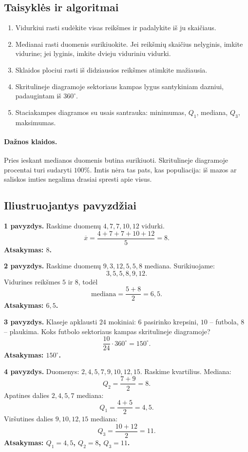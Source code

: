 \subsection{Taisyklės ir algoritmai}
\begin{enumerate}[label=\arabic*.]
\item Vidurkiui rasti sudėkite visas reikšmes ir padalykite iš ju skaičiaus.
\item Medianai rasti duomenis surikiuokite. Jei reikšmių skaičius nelyginis, imkite vidurine; jei lyginis, imkite dvieju viduriniu vidurki.
\item Sklaidos plociui rasti iš didziausios reikšmes atimkite mažiausia.
\item Skritulineje diagramoje sektoriaus kampas lygus santykiniam dazniui, padaugintam iš $360^\circ$.
\item Staciakampes diagramos su usais santrauka: minimumas, $Q_1$, mediana, $Q_3$, maksimumas.
\end{enumerate}
\paragraph{Dažnos klaidos.}
Pries ieskant medianos duomenis butina surikiuoti. Skritulineje diagramoje procentai turi sudaryti $100\%$. Imtis nėra tas pats, kas populiacija: iš mazos ar saliskos imties negalima drasiai spresti apie visus.

\subsection{Iliustruojantys pavyzdžiai}
\textbf{1 pavyzdys.} Raskime duomenų $4,7,7,10,12$ vidurki.
\[
\overline{x}=\frac{4+7+7+10+12}{5}=8.
\]
\textbf{Atsakymas: $8$.}

\textbf{2 pavyzdys.} Raskime duomenų $9,3,12,5,5,8$ mediana.
Surikiuojame:
\[
3,5,5,8,9,12.
\]
Vidurines reikšmes $5$ ir $8$, todėl
\[
\text{mediana}=\frac{5+8}{2}=6{,}5.
\]
\textbf{Atsakymas: $6{,}5$.}

\textbf{3 pavyzdys.} Klaseje apklausti $24$ mokiniai: $6$ pasirinko krepsini, $10$ -- futbola, $8$ -- plaukima. Koks futbolo sektoriaus kampas skritulineje diagramoje?
\[
\frac{10}{24}\cdot360^\circ=150^\circ.
\]
\textbf{Atsakymas: $150^\circ$.}

\textbf{4 pavyzdys.} Duomenys: $2,4,5,7,9,10,12,15$. Raskime kvartilius.
Mediana:
\[
Q_2=\frac{7+9}{2}=8.
\]
Apatines dalies $2,4,5,7$ mediana:
\[
Q_1=\frac{4+5}{2}=4{,}5.
\]
Viršutines dalies $9,10,12,15$ mediana:
\[
Q_3=\frac{10+12}{2}=11.
\]
\textbf{Atsakymas: $Q_1=4{,}5$, $Q_2=8$, $Q_3=11$.}

